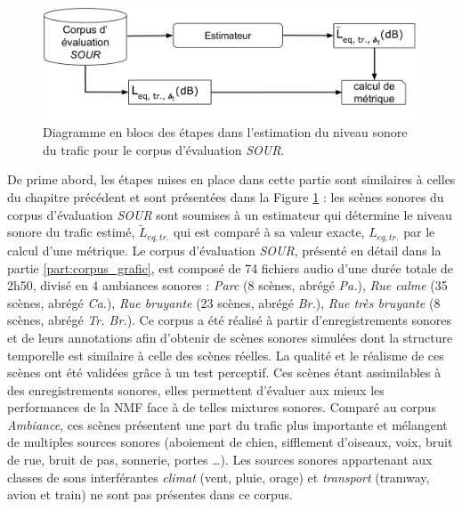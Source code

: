 \begin{figure}[ht]
\centering
\includegraphics[width=0.9\linewidth]{./figures/NMF/Bloc_diagram_estimateur_SOUR.pdf}
\caption{Diagramme en blocs des étapes dans l'estimation du niveau sonore du trafic pour le corpus d'évaluation \textit{SOUR}.}
\label{fig:diagram_SOUR}
\end{figure}


De prime abord, les étapes mises en place dans cette partie sont similaires à celles du chapitre précédent et sont présentées dans la Figure \ref{fig:diagram_SOUR} : les scènes sonores du corpus d'évaluation \textit{SOUR} sont soumises à un estimateur qui détermine le niveau sonore du trafic estimé, $\tilde{L}_{eq,tr.}$ qui est comparé à sa valeur exacte, $L_{eq,tr.}$ par le calcul d'une métrique.
Le corpus d'évaluation \textit{SOUR}, présenté en détail dans la partie \ref{part:corpus_grafic}, est composé de 74 fichiers audio d'une durée totale de 2h50, divisé en 4 ambiances sonores : \textit{Parc} (8 scènes, abrégé \textit{Pa.}), \textit{Rue calme} (35 scènes, abrégé \textit{Ca.}), \textit{Rue bruyante} (23 scènes, abrégé \textit{Br.}), \textit{Rue très bruyante} (8 scènes, abrégé \textit{Tr. Br.}). Ce corpus a été réalisé à partir d'enregistrements sonores et de leurs annotations afin d'obtenir de scènes sonores simulées dont la structure temporelle est similaire à celle des scènes réelles. La qualité et le réalisme de ces scènes ont été validées grâce à un test perceptif. Ces scènes étant assimilables à des enregistrements sonores, elles permettent d'évaluer aux mieux les performances de la NMF face à de telles mixtures sonores. Comparé au corpus \textit{Ambiance}, ces scènes présentent une part du trafic plus importante et mélangent de multiples sources sonores (aboiement de chien, sifflement d'oiseaux, voix, bruit de rue, bruit de pas, sonnerie, portes \dots{}). Les sources sonores appartenant aux classes de sons interférantes \textit{climat} (vent, pluie, orage) et \textit{transport} (tramway, avion et train) ne sont pas présentes dans ce corpus.

